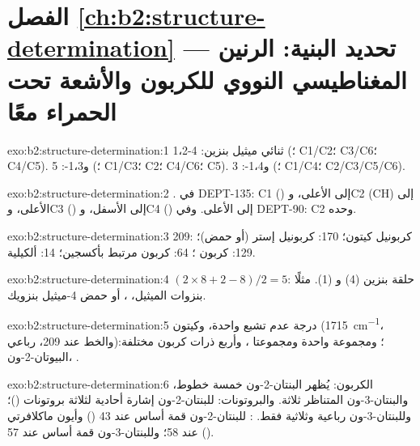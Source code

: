 \section*{الفصل \ref{ch:b2:structure-determination} --- تحديد البنية: الرنين المغناطيسي النووي للكربون \texorpdfstring{\protect{}}{13C}  والأشعة تحت الحمراء معًا}

\begin{solution}{exo:b2:structure-determination:1}
1،2-ثنائي ميثيل بنزين: 4 (؛ C1/C2؛ C3/C6؛ C4/C5). و1،3-: 5 (؛ C1/C3؛ C2؛ C4/C6؛ C5).
و1،4-: 3 (؛ C1/C4؛ C2/C3/C5/C6).
\end{solution}

\begin{solution}{exo:b2:structure-determination:2}
. في DEPT-135: C1 () إلى الأعلى، وC2 (CH) إلى الأعلى، وC3 () إلى الأسفل، وC4 () إلى الأعلى.
وفي DEPT-90: C2 وحده.
\end{solution}

\begin{solution}{exo:b2:structure-determination:3}
209: كربونيل كيتون؛ 170: كربونيل إستر (أو حمض)؛ 129: كربون ؛ 64: كربون مرتبط
بأكسجين؛ 14:  ألكيلية.
\end{solution}

\begin{solution}{exo:b2:structure-determination:4}
$(2 \times 8 + 2 - 8)/2 = 5$: حلقة بنزين (4) و (1). مثلًا بنزوات الميثيل،
، أو حمض 4-ميثيل بنزويك.
\end{solution}

\begin{solution}{exo:b2:structure-determination:5}
درجة عدم تشبع واحدة، وكيتون (\qty{1715}{cm^{-1}}، والخط عند 209، رباعي)؛ ومجموعة  واحدة ومجموعتا
، وأربع ذرات كربون مختلفة: البيوتان-2-ون، .
\end{solution}

\begin{solution}{exo:b2:structure-determination:6}
الكربون: يُظهر البنتان-2-ون خمسة خطوط، والبنتان-3-ون المتناظر ثلاثة. والبروتونات: للبنتان-2-ون إشارة
أحادية لثلاثة بروتونات ()؛ وللبنتان-3-ون رباعية وثلاثية فقط. : للبنتان-2-ون
قمة أساس عند 43 () وأيون ماكلافرتي عند 58؛ وللبنتان-3-ون قمة أساس عند 57
().
\end{solution}

